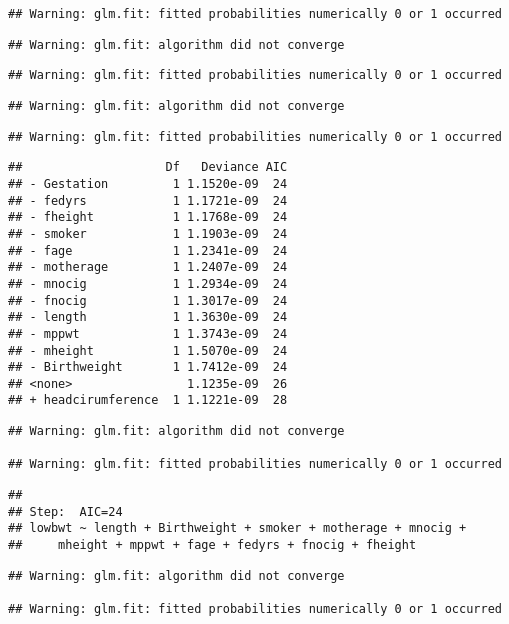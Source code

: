 \documentclass[]{article}
\begin{document}
\begin{verbatim}
## Warning: glm.fit: fitted probabilities numerically 0 or 1 occurred
\end{verbatim}

\begin{verbatim}
## Warning: glm.fit: algorithm did not converge
\end{verbatim}

\begin{verbatim}
## Warning: glm.fit: fitted probabilities numerically 0 or 1 occurred
\end{verbatim}

\begin{verbatim}
## Warning: glm.fit: algorithm did not converge
\end{verbatim}

\begin{verbatim}
## Warning: glm.fit: fitted probabilities numerically 0 or 1 occurred
\end{verbatim}

\begin{verbatim}
##                    Df   Deviance AIC
## - Gestation         1 1.1520e-09  24
## - fedyrs            1 1.1721e-09  24
## - fheight           1 1.1768e-09  24
## - smoker            1 1.1903e-09  24
## - fage              1 1.2341e-09  24
## - motherage         1 1.2407e-09  24
## - mnocig            1 1.2934e-09  24
## - fnocig            1 1.3017e-09  24
## - length            1 1.3630e-09  24
## - mppwt             1 1.3743e-09  24
## - mheight           1 1.5070e-09  24
## - Birthweight       1 1.7412e-09  24
## <none>                1.1235e-09  26
## + headcirumference  1 1.1221e-09  28
\end{verbatim}

\begin{verbatim}
## Warning: glm.fit: algorithm did not converge

## Warning: glm.fit: fitted probabilities numerically 0 or 1 occurred
\end{verbatim}

\begin{verbatim}
## 
## Step:  AIC=24
## lowbwt ~ length + Birthweight + smoker + motherage + mnocig + 
##     mheight + mppwt + fage + fedyrs + fnocig + fheight
\end{verbatim}

\begin{verbatim}
## Warning: glm.fit: algorithm did not converge

## Warning: glm.fit: fitted probabilities numerically 0 or 1 occurred
\end{verbatim}
\end{document}
